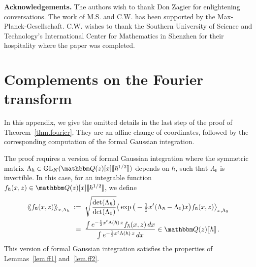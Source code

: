 \documentclass[12pt,reqno]{amsart}
\theoremstyle{definition}
\def\BQ{\mathbbm Q}
\def\be{\begin{equation}}
\def\ee{\end{equation}}
\def\GL{\mathrm{GL}}
\def\hb{\hbar}
\def\llangle{\left\langle\!\left\langle}
\def\rrangle{\right\rangle\!\right\rangle}
\renewcommand{\=}{\;=\;}
\begin{document}
\newpage

\noindent \textbf{Acknowledgements.} The authors wish to thank Don Zagier for enlightening conversations.
The work of M.S. and C.W. has been supported by the Max-Planck-Gesellschaft.
C.W. wishes to thank the Southern University of Science and Technology's
International Center for Mathematics in
Shenzhen for their hospitality where the paper was completed.


\appendix

\section{Complements on the Fourier transform}
\label{app.fourier}

In this appendix, we give the omitted details in the last step of the proof
of Theorem~\ref{thm.fourier}. They are an affine change of coordinates, followed
by the corresponding computation of the formal Gaussian integration.

The proof requires a version of formal Gaussian integration where the symmetric
matrix $\Lambda_\hbar \in \GL_N(\BQ(z)[x]\llbracket \hbar^{1/2} \rrbracket)$
depends on $\hbar$, such that $\Lambda_0$ is invertible. In this case, for an
integrable function $f_\hbar(x,z) \in \BQ(z)[x]\llbracket \hbar^{1/2}\rrbracket$,
we define 
\be
\label{FGIh}
\begin{aligned}
\llangle f_\hbar(x,z) \rrangle_{x,\Lambda_\hbar}
\;&:=\; \sqrt{\frac{\det(\Lambda_\hb)}{\det(\Lambda_0)}}
\big\langle
\exp\big(-\tfrac{1}{2} x^t(\Lambda_\hb-\Lambda_0)x \big)  f_\hbar(x,z)
\big\rangle_{x, \Lambda_0} \\
&\=
\frac{\int e^{-\frac12x^t \Lambda(\hb) \,x}f_{\hb}(x,z) \, dx}{
  \int e^{-\frac12x^t \Lambda(\hb) \,x} \, dx}
\in \BQ(z)\llbracket \hbar \rrbracket \,.
\end{aligned}
\ee
This version of formal Gaussian integration satisfies the properties of
Lemmas~\ref{lem.ff1} and~\ref{lem.ff2}. 
\end{document}
